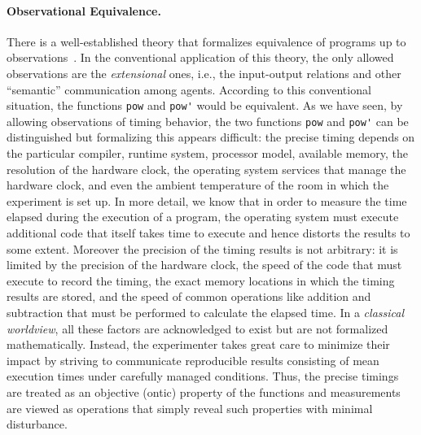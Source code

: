 \paragraph*{Observational Equivalence.} There is a well-established
theory that formalizes equivalence of programs up to
observations~\cite{Barendregt:Lambda,Milner:1999:CMS:329902}. In the
conventional application of this theory, the only allowed observations
are the \emph{extensional} ones, i.e., the input-output relations and
other ``semantic'' communication among agents. According to this
conventional situation, the functions \verb|pow| and \verb|pow'| would
be equivalent. As we have seen, by allowing observations of timing
behavior, the two functions \verb|pow| and \verb|pow'| can be
distinguished but formalizing this appears difficult: the precise
timing depends on the particular compiler, runtime system, processor
model, available memory, the resolution of the hardware clock, the
operating system services that manage the hardware clock, and even the
ambient temperature of the room in which the experiment is set up. In
more detail, we know that in order to measure the time elapsed during
the execution of a program, the operating system must execute
additional code that itself takes time to execute and hence distorts
the results to some extent. Moreover the precision of the timing
results is not arbitrary: it is limited by the precision of the
hardware clock, the speed of the code that must execute to record the
timing, the exact memory locations in which the timing results are
stored, and the speed of common operations like addition and
subtraction that must be performed to calculate the elapsed time. In a
\emph{classical worldview}, all these factors are acknowledged to
exist but are not formalized mathematically. Instead, the experimenter
takes great care to minimize their impact by striving to communicate
reproducible results consisting of mean execution times under
carefully managed conditions. Thus, the precise timings are treated as
an objective (ontic) property of the functions and measurements are
viewed as operations that simply reveal such properties with minimal
disturbance.

